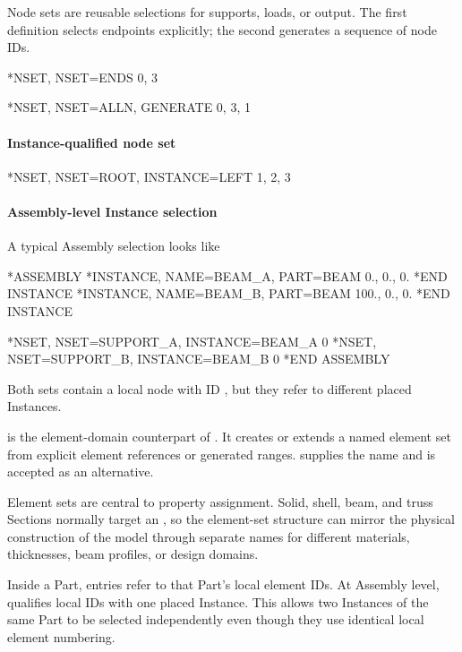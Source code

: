 Node sets are reusable selections for supports, loads, or output. The first definition selects endpoints explicitly; the second generates a sequence of node IDs.

\exampleheading

\begin{inputdeck}
*NSET, NSET=ENDS
0, 3

*NSET, NSET=ALLN, GENERATE
0, 3, 1
\end{inputdeck}

\paragraph*{Instance-qualified node set}
\begin{inputdeck}
*NSET, NSET=ROOT, INSTANCE=LEFT
1, 2, 3
\end{inputdeck}

\clearpage
\paragraph*{Assembly-level Instance selection}

A typical Assembly selection looks like
\begin{syntax}
*ASSEMBLY
*INSTANCE, NAME=BEAM_A, PART=BEAM
0., 0., 0.
*END INSTANCE
*INSTANCE, NAME=BEAM_B, PART=BEAM
100., 0., 0.
*END INSTANCE

*NSET, NSET=SUPPORT_A, INSTANCE=BEAM_A
0
*NSET, NSET=SUPPORT_B, INSTANCE=BEAM_B
0
*END ASSEMBLY
\end{syntax}
Both sets contain a local node with ID , but they refer to different placed Instances.


 is the element-domain counterpart of . It creates or extends a named element set from explicit element references or generated ranges.  supplies the name and  is accepted as an alternative.

Element sets are central to property assignment. Solid, shell, beam, and truss Sections normally target an , so the element-set structure can mirror the physical construction of the model through separate names for different materials, thicknesses, beam profiles, or design domains.

Inside a Part, entries refer to that Part's local element IDs. At Assembly level,  qualifies local IDs with one placed Instance. This allows two Instances of the same Part to be selected independently even though they use identical local element numbering.

